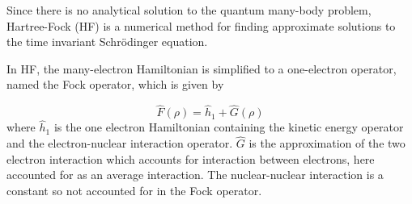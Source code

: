 \documentclass[twoside,11pt]{article}
\begin{document}




Since there is no analytical solution to the quantum many-body problem, Hartree-Fock (HF) is a numerical method for finding approximate solutions to the time invariant Schr\"{o}dinger equation. 










In HF, the many-electron Hamiltonian is simplified to a one-electron operator, named the Fock operator, which is given by

\[
\hat{F}(\rho) = \hat{h}_1 + \hat{G}(\rho)
\]
where $\hat{h}_1$ is the one electron Hamiltonian containing the kinetic energy operator and the electron-nuclear interaction operator. $\hat{G}$ is the approximation of the two electron interaction which accounts for interaction between electrons, here accounted for as an average interaction. The nuclear-nuclear interaction is a constant so not accounted for in the Fock operator. 
\end{document}
